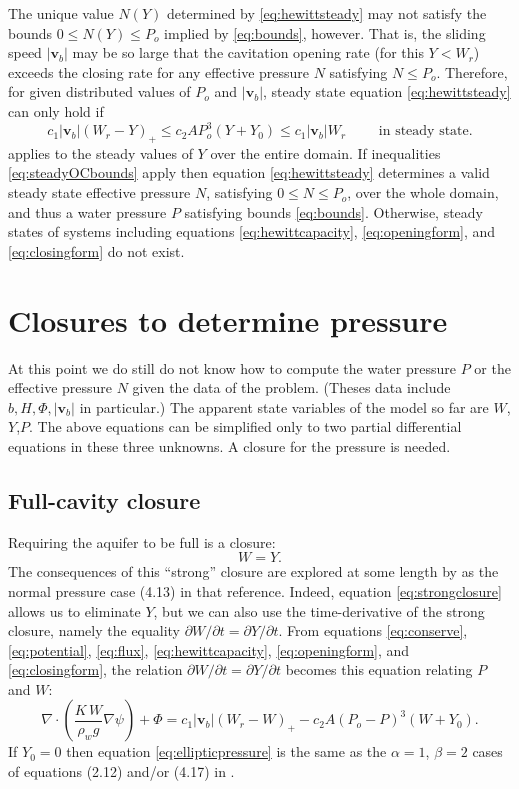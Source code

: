\documentclass[11pt,final]{amsart}%
\newcommand\bv{\mathbf{v}}
\newcommand{\Div}{\nabla\cdot}
\newcommand{\grad}{\nabla}
\begin{document}
The unique value $N(Y)$ determined by \eqref{eq:hewittsteady} may not satisfy the bounds $0\le N(Y) \le P_o$ implied by \eqref{eq:bounds}, however.  That is, the sliding speed $|\bv_b|$ may be so large that the cavitation opening rate (for this $Y < W_r$) exceeds the closing rate for any effective pressure $N$ satisfying $N\le P_o$.  Therefore, for given distributed values of $P_o$ and $|\bv_b|$, steady state equation \eqref{eq:hewittsteady} can only hold if
\begin{equation}
c_1 |\bv_b| (W_r - Y)_+ \le c_2 A P_o^3 (Y+Y_0) \le c_1 |\bv_b| W_r \qquad \text{ in steady state}. \label{eq:steadyOCbounds}
\end{equation}
applies to the steady values of $Y$ over the entire domain.  If inequalities \eqref{eq:steadyOCbounds} apply then equation \eqref{eq:hewittsteady} determines a valid steady state effective pressure $N$, satisfying $0\le N \le P_o$, over the whole domain, and thus a water pressure $P$ satisfying bounds \eqref{eq:bounds}.  Otherwise, steady states of systems including equations \eqref{eq:hewittcapacity}, \eqref{eq:openingform}, and \eqref{eq:closingform} do not exist.


\section{Closures to determine pressure} \label{sec:closures}

At this point we do still do not know how to compute the water pressure $P$ or the effective pressure $N$ given the data of the problem.  (Theses data include $b,H,\Phi,|\bv_b|$ in particular.)  The apparent state variables of the model so far are $W$,$Y$,$P$.  The above equations can be simplified only to two partial differential equations in these three unknowns.   A closure for the pressure is needed.

\subsection*{Full-cavity closure}  Requiring the aquifer to be full is a closure:
\begin{equation}
W = Y.\label{eq:strongclosure}
\end{equation}
The consequences of this ``strong'' closure are explored at some length by \cite{Schoofetal2012} as the normal pressure case (4.13) in that reference.  Indeed, equation \eqref{eq:strongclosure} allows us to eliminate $Y$, but we can also use the time-derivative of the strong closure, namely the equality $\partial W/\partial t = \partial Y/\partial t$.  From equations \eqref{eq:conserve}, \eqref{eq:potential}, \eqref{eq:flux}, \eqref{eq:hewittcapacity}, \eqref{eq:openingform}, and \eqref{eq:closingform}, the relation $\partial W/\partial t = \partial Y/\partial t$ becomes this equation relating $P$ and $W$:
\begin{equation}
\Div \left(\frac{K\,W}{\rho_w g} \grad \psi \right) + \Phi = c_1 |\bv_b| (W_r - W)_+ - c_2 A (P_o - P)^3 (W+Y_0).\label{eq:ellipticpressure}
\end{equation}
If $Y_0=0$ then equation \eqref{eq:ellipticpressure} is the same as the $\alpha=1$, $\beta=2$ cases of equations (2.12) and/or (4.17) in \citep{Schoofetal2012}.
\end{document}
